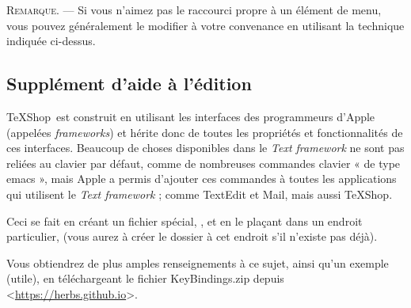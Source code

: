 \documentclass[11pt,french]{article}
\newcommand{\TS}{\textsf{\TeX Shop}}
\newcommand{\cmd}[1]{\textsf{#1}}
\newcommand{\mnu}[1]{\textsf{#1}}
\newcommand{\To}{\,\(\to\)\,}
\begin{document}


\textsc{Remarque}. --- Si vous n'aimez pas le raccourci propre à un élément de menu, vous pouvez généralement le modifier à votre convenance en utilisant la technique indiquée ci-dessus.

\subsection{Supplément d'aide à l'édition}

\TS\ est construit en utilisant les interfaces des programmeurs d'Apple (appelées \emph{frameworks}) et hérite donc de toutes les propriétés et fonctionnalités de ces interfaces. Beaucoup de choses disponibles dans le \emph{Text framework} ne sont pas reliées au clavier par défaut, comme de nombreuses commandes clavier « de type \cmd{emacs} », mais Apple a permis d'ajouter ces commandes à toutes les applications qui utilisent le \emph{Text framework} ; comme \textsf{TextEdit} et \textsf{Mail}, mais aussi \TS.

Ceci se fait en créant un fichier spécial, , et en le plaçant dans un endroit particulier,  (vous aurez à créer le dossier  à cet endroit s'il n'existe pas déjà).

Vous obtiendrez de plus amples renseignements à ce sujet, ainsi qu'un exemple (utile), en téléchargeant le fichier \textsf{KeyBindings.zip} depuis <\url{https://herbs.github.io}>.
\end{document}
